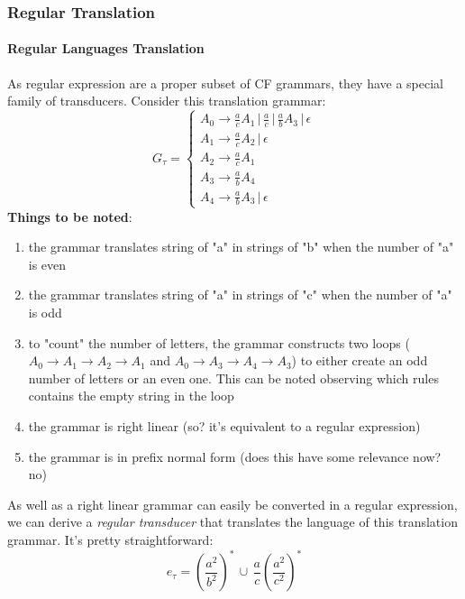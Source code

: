 			\subsubsection{Regular Translation}
				\paragraph{Regular Languages Translation}
					As regular expression are a proper subset of CF grammars, they have a special family of transducers. Consider this translation grammar:
					\begin{equation}
						G_\tau = 
						\begin{cases}
							A_0 \rightarrow \frac{a}{c}A_1 \,\vert\, \frac{a}{c} \,\vert\, \frac{a}{b}A_3 \,\vert\, \epsilon \\
							A_1 \rightarrow \frac{a}{c}A_2 \,\vert\, \epsilon \\
							A_2 \rightarrow \frac{a}{c}A_1 \\
							A_3 \rightarrow \frac{a}{b}A_4 \\
							A_4 \rightarrow \frac{a}{b}A_3 \,\vert\, \epsilon 
						\end{cases}
					\end{equation}
					\textbf{Things to be noted}:
					\begin{enumerate}
						\item the grammar translates string of "a" in strings of "b" when the number of "a" is even
						\item the grammar translates string of "a" in strings of "c" when the number of "a" is odd
						\item to "count" the number of letters, the grammar constructs two loops ($A_0 \rightarrow A_1 \rightarrow A_2 \rightarrow A_1$ and $A_0 \rightarrow A_3 \rightarrow A_4 \rightarrow A_3$) to either create an odd number of letters or an even one. This can be noted observing which rules contains the empty string in the loop
						\item the grammar is right linear (so? it's equivalent to a regular expression)
						\item the grammar is in prefix normal form (does this have some relevance now? no)
					\end{enumerate}
					As well as a right linear grammar can easily be converted in a regular expression, we can derive a \emph{regular transducer} that translates the language of this translation grammar. It's pretty straightforward:
					\begin{equation}
						e_\tau = \left(\frac{a^2}{b^2} \right)^\ast \,\cup\, \frac{a}{c} \left(\frac{a^2}{c^2} \right)^\ast
					\end{equation}
					
